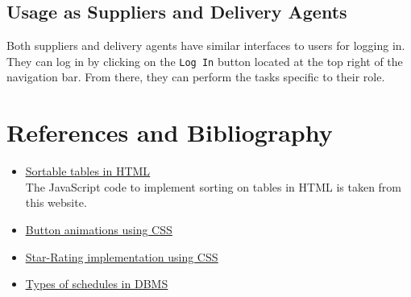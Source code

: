 \documentclass[12pt]{report}
\begin{document}
    \subsection*{Usage as Suppliers and Delivery Agents}
    Both suppliers and delivery agents have similar interfaces to users for logging in.
    They can log in by clicking on the \texttt{Log In} button located at the top right of the navigation bar.
    From there, they can perform the tasks specific to their role.

    \vfill \pagebreak

    \section*{References and Bibliography}

    \begin{itemize}
        \item \href{https://mdbootstrap.com/docs/b4/jquery/tables/sort/}{\color{blue}\underline{Sortable tables in HTML}} \\
        The JavaScript code to implement sorting on tables in HTML is taken from this website.
        \item \href{https://www.w3schools.com/howto/howto_css_animate_buttons.asp}{\color{blue}\underline{Button animations using CSS}}
        \item \href{https://codepen.io/hesguru/pen/BaybqXv}{\color{blue}\underline{Star-Rating implementation using CSS}}
        \item \href{https://www.geeksforgeeks.org/types-of-schedules-in-dbms/}{\color{blue}\underline{Types of schedules in DBMS}}
    \end{itemize}
\end{document}
